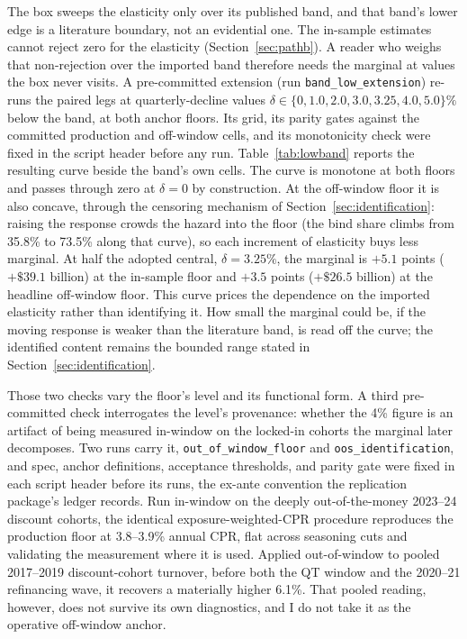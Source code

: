 \documentclass[12pt]{article}
\begin{document}
The box sweeps the elasticity only over its published band, and that band's lower edge is a literature boundary, not an evidential one. The in-sample estimates cannot reject zero for the elasticity (Section~\ref{sec:pathb}). A reader who weighs that non-rejection over the imported band therefore needs the marginal at values the box never visits. A pre-committed extension (run \texttt{band\_low\_extension}) re-runs the paired legs at quarterly-decline values $\delta \in \{0, 1.0, 2.0, 3.0, 3.25, 4.0, 5.0\}\%$ below the band, at both anchor floors. Its grid, its parity gates against the committed production and off-window cells, and its monotonicity check were fixed in the script header before any run. Table~\ref{tab:lowband} reports the resulting curve beside the band's own cells. The curve is monotone at both floors and passes through zero at $\delta = 0$ by construction. At the off-window floor it is also concave, through the censoring mechanism of Section~\ref{sec:identification}: raising the response crowds the hazard into the floor (the bind share climbs from 35.8\% to 73.5\% along that curve), so each increment of elasticity buys less marginal. At half the adopted central, $\delta = 3.25\%$, the marginal is $+5.1$ points ($+\$39.1$ billion) at the in-sample floor and $+3.5$ points ($+\$26.5$ billion) at the headline off-window floor. This curve prices the dependence on the imported elasticity rather than identifying it. How small the marginal could be, if the moving response is weaker than the literature band, is read off the curve; the identified content remains the bounded range stated in Section~\ref{sec:identification}.


Those two checks vary the floor's level and its functional form. A third pre-committed check interrogates the level's provenance: whether the 4\% figure is an artifact of being measured in-window on the locked-in cohorts the marginal later decomposes. Two runs carry it, \texttt{out\_of\_window\_floor} and \texttt{oos\_identification}, and spec, anchor definitions, acceptance thresholds, and parity gate were fixed in each script header before its runs, the ex-ante convention the replication package's ledger records. Run in-window on the deeply out-of-the-money 2023--24 discount cohorts, the identical exposure-weighted-CPR procedure reproduces the production floor at 3.8--3.9\% annual CPR, flat across seasoning cuts and validating the measurement where it is used. Applied out-of-window to pooled 2017--2019 discount-cohort turnover, before both the QT window and the 2020--21 refinancing wave, it recovers a materially higher 6.1\%. That pooled reading, however, does not survive its own diagnostics, and I do not take it as the operative off-window anchor.
\end{document}
